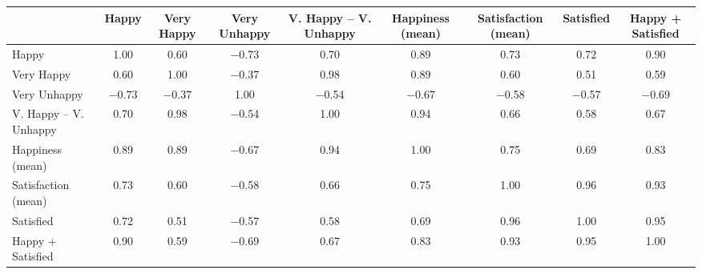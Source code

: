 \begin{tabular}{lcccccccc}
\toprule
& Happy & Very Happy & Very Unhappy & V. Happy -- V. Unhappy & Happiness (mean) & Satisfaction (mean) & Satisfied & Happy + Satisfied \\
\midrule
Happy & 1.00 & 0.60 & \ensuremath{-}0.73 & 0.70 & 0.89 & 0.73 & 0.72 & 0.90 \\
Very Happy & 0.60 & 1.00 & \ensuremath{-}0.37 & 0.98 & 0.89 & 0.60 & 0.51 & 0.59 \\
Very Unhappy & \ensuremath{-}0.73 & \ensuremath{-}0.37 & 1.00 & \ensuremath{-}0.54 & \ensuremath{-}0.67 & \ensuremath{-}0.58 & \ensuremath{-}0.57 & \ensuremath{-}0.69 \\
V. Happy -- V. Unhappy & 0.70 & 0.98 & \ensuremath{-}0.54 & 1.00 & 0.94 & 0.66 & 0.58 & 0.67 \\
Happiness (mean) & 0.89 & 0.89 & \ensuremath{-}0.67 & 0.94 & 1.00 & 0.75 & 0.69 & 0.83 \\
Satisfaction (mean) & 0.73 & 0.60 & \ensuremath{-}0.58 & 0.66 & 0.75 & 1.00 & 0.96 & 0.93 \\
Satisfied & 0.72 & 0.51 & \ensuremath{-}0.57 & 0.58 & 0.69 & 0.96 & 1.00 & 0.95 \\
Happy + Satisfied & 0.90 & 0.59 & \ensuremath{-}0.69 & 0.67 & 0.83 & 0.93 & 0.95 & 1.00 \\
\bottomrule
\end{tabular}
